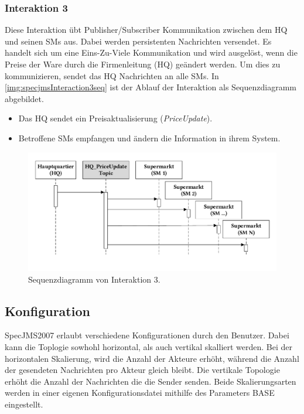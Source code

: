 \subsubsection{Interaktion 3}
\label{sec:interaction3desc}
Diese Interaktion übt Publisher/Subscriber Kommunikation zwischen dem HQ und seinen SMs aus. Dabei werden persistenten Nachrichten versendet. Es handelt sich um eine Eins-Zu-Viele Kommunikation und wird ausgelöst, wenn die Preise der Ware durch die Firmenleitung (HQ) geändert werden. Um dies zu kommunizieren, sendet das HQ Nachrichten an alle SMs. In \autoref{img:specjmsInteraction3seq} ist der Ablauf der Interaktion als Sequenzdiagramm abgebildet.
\begin{itemize}
    \item Das HQ sendet ein Preisaktualisierung (\emph{PriceUpdate}).
    \item Betroffene SMs empfangen und ändern die Information in ihrem System.
\end{itemize}


\begin{figure}
\center
  \includegraphics[width=1\textwidth]{images/evaluation/specjms/evaluationInteraktion3seq.pdf}
  \caption{Sequenzdiagramm von Interaktion 3.}
  \label{img:specjmsInteraction3seq}
\end{figure}


\subsection{Konfiguration}
SpecJMS2007 erlaubt verschiedene Konfigurationen durch den Benutzer. Dabei kann die Toplogie sowhohl horizontal, als auch vertikal skalliert werden. Bei der horizontalen Skalierung, wird die Anzahl der Akteure erhöht, während die Anzahl der gesendeten Nachrichten pro Akteur gleich bleibt. Die vertikale Topologie erhöht die Anzahl der Nachrichten die die Sender senden. Beide Skalierungsarten werden in einer eigenen Konfigurationsdatei mithilfe des Parameters BASE eingestellt.

